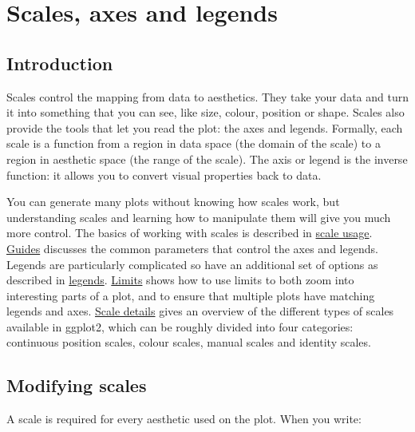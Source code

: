 \chapter{Scales, axes and legends}\label{cha:scales}

\section{Introduction}\label{introduction}

Scales control the mapping from data to aesthetics. They take your data
and turn it into something that you can see, like size, colour, position
or shape. Scales also provide the tools that let you read the plot: the
axes and legends. Formally, each scale is a function from a region in
data space (the domain of the scale) to a region in aesthetic space (the
range of the scale). The axis or legend is the inverse function: it
allows you to convert visual properties back to data. 

You can generate many plots without knowing how scales work, but
understanding scales and learning how to manipulate them will give you
much more control. The basics of working with scales is described in
\protect\hyperlink{sec:scale-usage}{scale usage}.
\protect\hyperlink{sec:guides}{Guides} discusses the common parameters
that control the axes and legends. Legends are particularly complicated
so have an additional set of options as described in
\protect\hyperlink{sec:legends}{legends}.
\protect\hyperlink{sec:limits}{Limits} shows how to use limits to both
zoom into interesting parts of a plot, and to ensure that multiple plots
have matching legends and axes.
\protect\hyperlink{sec:scale-details}{Scale details} gives an overview
of the different types of scales available in ggplot2, which can be
roughly divided into four categories: continuous position scales, colour
scales, manual scales and identity scales.

\hypertarget{sec:scale-usage}{\section{Modifying
scales}\label{sec:scale-usage}}

A scale is required for every aesthetic used on the plot. When you
write:

\begin{Shaded}
\begin{Highlighting}[]
\StringTok{ }
\StringTok{  }\NormalTok{(}\NormalTok{(} 
\end{Highlighting}
\end{Shaded}

